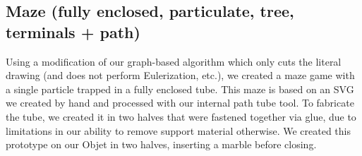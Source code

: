 \subsection{Maze (fully enclosed, particulate, tree, terminals + path)}

Using a modification of our graph-based algorithm which only cuts the literal drawing (and does not perform Eulerization, etc.), we created a maze game with a single particle trapped in a fully enclosed tube.  This maze is based on an SVG we created by hand and processed with our internal path tube tool.  To fabricate the tube, we created it in two halves that were fastened together via glue, due to limitations in our ability to remove support material otherwise.     We created this prototype on our Objet in two halves, inserting a marble before closing.